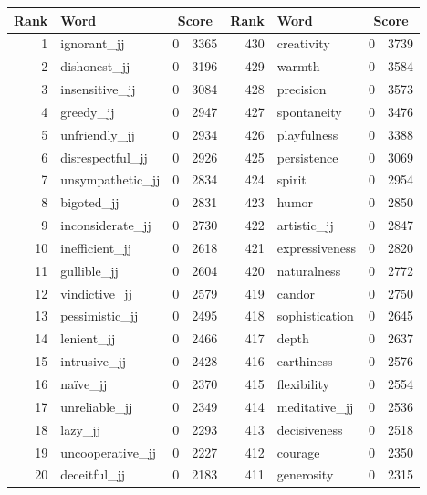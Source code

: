 \begin{table}[tbp]
    \begin{tabular}{| rlr@{.}l | rlr@{.}l |}
    \hline
    \textbf{Rank} & \textbf{Word} & \multicolumn{2}{c|}{\textbf{Score}} & \textbf{Rank} & \textbf{Word} & \multicolumn{2}{c|}{\textbf{Score}} \\
    \hline
    1 & ignorant\_jj & 0 & 3365    &    430 & creativity & 0 & 3739 \\
    2 & dishonest\_jj & 0 & 3196    &    429 & warmth & 0 & 3584 \\
    3 & insensitive\_jj & 0 & 3084    &    428 & precision & 0 & 3573 \\
    4 & greedy\_jj & 0 & 2947    &    427 & spontaneity & 0 & 3476 \\
    5 & unfriendly\_jj & 0 & 2934    &    426 & playfulness & 0 & 3388 \\
    6 & disrespectful\_jj & 0 & 2926    &    425 & persistence & 0 & 3069 \\
    7 & unsympathetic\_jj & 0 & 2834    &    424 & spirit & 0 & 2954 \\
    8 & bigoted\_jj & 0 & 2831    &    423 & humor & 0 & 2850 \\
    9 & inconsiderate\_jj & 0 & 2730    &    422 & artistic\_jj & 0 & 2847 \\
    10 & inefficient\_jj & 0 & 2618    &    421 & expressiveness & 0 & 2820 \\
    11 & gullible\_jj & 0 & 2604    &    420 & naturalness & 0 & 2772 \\
    12 & vindictive\_jj & 0 & 2579    &    419 & candor & 0 & 2750 \\
    13 & pessimistic\_jj & 0 & 2495    &    418 & sophistication & 0 & 2645 \\
    14 & lenient\_jj & 0 & 2466    &    417 & depth & 0 & 2637 \\
    15 & intrusive\_jj & 0 & 2428    &    416 & earthiness & 0 & 2576 \\
    16 & naïve\_jj & 0 & 2370    &    415 & flexibility & 0 & 2554 \\
    17 & unreliable\_jj & 0 & 2349    &    414 & meditative\_jj & 0 & 2536 \\
    18 & lazy\_jj & 0 & 2293    &    413 & decisiveness & 0 & 2518 \\
    19 & uncooperative\_jj & 0 & 2227    &    412 & courage & 0 & 2350 \\
    20 & deceitful\_jj & 0 & 2183    &    411 & generosity & 0 & 2315 \\

\end{tabular}
\end{table}
